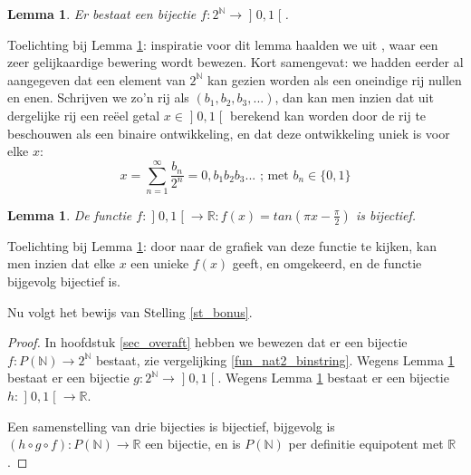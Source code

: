 \documentclass[hidelinks,11pt,a4paper]{article}
\newtheorem{lemma}[stelling]{Lemma}
\begin{document}
\begin{lemma}
\label{lemma_2N_int01} 
Er bestaat een bijectie $f: 2^{\mathbb{N}} \to \mathopen]0,1\mathclose[ $. 
\end{lemma}
Toelichting bij Lemma \ref{lemma_2N_int01}: inspiratie voor dit lemma haalden we uit \cite{youtube_penn}, waar een zeer gelijkaardige bewering wordt bewezen. 
Kort samengevat: we hadden eerder al aangegeven dat een element van $2^{\mathbb{N}}$ kan gezien worden als een oneindige rij nullen en enen. 
Schrijven we zo'n rij als  $(b_1, b_2, b_3, ...)$, dan kan men inzien dat uit dergelijke rij een re\"eel getal $x \in \mathopen]0,1\mathclose[$ berekend kan worden door de rij te beschouwen als een binaire ontwikkeling, en dat deze ontwikkeling uniek is voor elke $x$: 
\[ 
x = \sum_{n=1}^{\infty}{\frac{b_n}{2^n}} = 0,b_1 b_2 b_3 ...  \text{ ; met } b_n \in \{0,1\} 
\] 

\begin{lemma}
\label{lemma_int01_R} 
De functie $f: \mathopen]0,1\mathclose[ \to \mathbb{R} : f(x) = tan(\pi x - \frac{\pi}{2})$ is bijectief. 
\end{lemma}
Toelichting bij Lemma \ref{lemma_int01_R}: door naar de grafiek van deze functie te kijken, kan men inzien dat elke $x$ een unieke $f(x)$ geeft, en omgekeerd, en de functie bijgevolg bijectief is. 

Nu volgt het bewijs van Stelling \ref{st_bonus}. 
\begin{proof}
In hoofdstuk \ref{sec_overaft} hebben we bewezen dat er een bijectie $f: P(\mathbb{N}) \to  2^{\mathbb{N}}$ bestaat, zie vergelijking \eqref{fun_nat2_binstring}. 
Wegens Lemma \ref{lemma_2N_int01} bestaat er een bijectie 
$g: 2^{\mathbb{N}} \to \mathopen]0,1\mathclose[ $. 
Wegens Lemma \ref{lemma_int01_R} bestaat er een bijectie 
$h: \mathopen]0,1\mathclose[ \to \mathbb{R}$. 

Een samenstelling van drie bijecties is bijectief, bijgevolg is $(h \circ g \circ f): P(\mathbb{N}) \to  \mathbb{R}  $ een bijectie, en is $P(\mathbb{N})$ 
per definitie equipotent met $\mathbb{R}$ . 
\end{proof}
\end{document}
